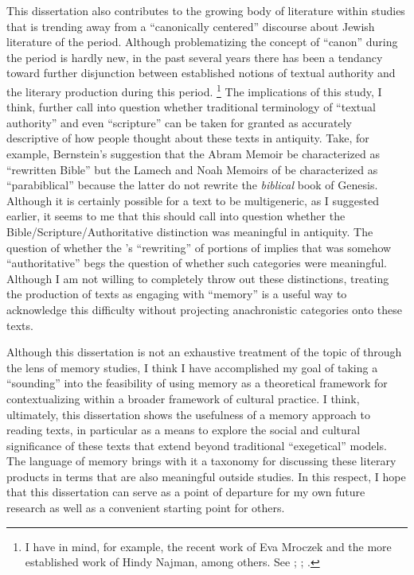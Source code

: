 This dissertation also contributes to the growing body of literature within \secondtemple studies that is trending away from a ``canonically centered'' discourse about Jewish literature of the \secondtemple period. Although problematizing the concept of ``canon'' during the \secondtemple period is hardly new, in the past several years there has been a tendancy toward further disjunction between established notions of textual authority and the literary production during this period.%
    \footnote{I have in mind, for example, the recent work of Eva Mroczek and the more established work of Hindy Najman, among others. See \cite{mroczek2016}; \cite{najman_jsj2012}; \cite{najman2003}.}
The implications of this study, I think, further call into question whether traditional terminology of ``textual authority'' and even ``scripture'' can be taken for granted as accurately descriptive of how people thought about these texts in antiquity. Take, for example, Bernstein's suggestion that the Abram Memoir be characterized as  ``rewritten Bible'' but the Lamech and Noah Memoirs of \ga be characterized as ``parabiblical'' because the latter do not rewrite the \emph{biblical} book of Genesis. Although it is certainly possible for a text to be multigeneric, as I suggested earlier, it seems to me that this should call into question whether the Bible/Scripture/Authoritative distinction was meaningful in antiquity. The question of whether the \ga's ``rewriting'' of portions of \firstenoch implies that \firstenoch was somehow ``authoritative'' begs the question of whether such categories were meaningful. Although I am not willing to completely throw out these distinctions, treating the production of \rwb texts as engaging with ``memory'' is a useful way to acknowledge this difficulty without projecting anachronistic categories onto these texts.


Although this dissertation is not an exhaustive treatment of the topic of \rwb through the lens of memory studies, I think I have accomplished my goal of taking a ``sounding'' into the feasibility of using memory as a theoretical framework for contextualizing \rwb within a broader framework of cultural practice. I think, ultimately, this dissertation shows the usefulness of a memory approach to reading \rwb texts, in particular as a means to explore the social and cultural significance of these texts that extend beyond traditional ``exegetical'' models. The language of memory  brings with it a taxonomy for discussing these literary products in terms that are also meaningful outside \secondtemple studies. In this respect, I hope that this dissertation can serve as a point of departure for my own future research as well as a convenient starting point for others. 
